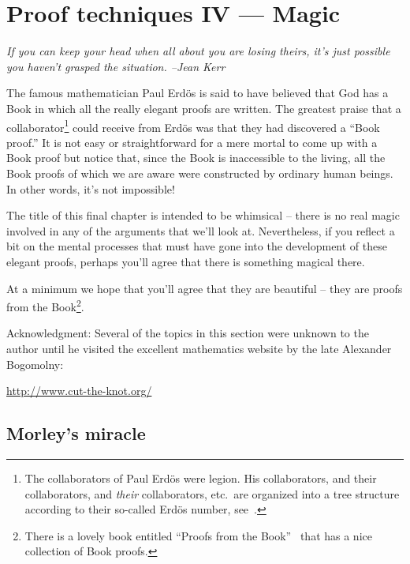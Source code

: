 
\chapter{Proof techniques IV --- Magic}
\label{ch:magic}

{\em If you can keep your head when all about you are losing theirs, it's 
just possible you haven't grasped the situation. --Jean Kerr} 

\vspace{.3in}

The famous mathematician 
 Paul Erd\"{o}s is said to have believed that
God has a Book in which all the really elegant proofs are written.
The greatest praise that a collaborator\footnote{The collaborators
of Paul Erd\"{o}s were legion.  His collaborators, and their collaborators,
and \emph{their} collaborators, etc.\ are organized into a tree structure 
according to their so-called Erd\"{o}s number,
see~\cite{wiki-Erdos_number}.} could receive from Erd\"{o}s
was that they had discovered a ``Book proof.''   It is not
easy or straightforward for a mere mortal to come up with a Book 
proof but notice that, since the Book is inaccessible to the living,
all the Book proofs of which we are aware were constructed by ordinary
human beings.  In other words, it's not impossible!

The title of this final chapter is intended to be whimsical -- there
is no real magic involved in any of the arguments that we'll look at.  
Nevertheless, if you  reflect a bit on the mental processes that 
must have gone into the development of these elegant proofs, perhaps
you'll agree that there is something magical there.   

At a minimum
we hope that you'll agree that they are beautiful -- they are proofs
from the Book\footnote{There is a lovely book entitled ``Proofs from the
Book''~\cite{pftB} that has a nice collection of Book proofs.}.

Acknowledgment: Several of the topics in this section were unknown to
the author until he visited the excellent mathematics website
by the late Alexander Bogomolny:

\url{http://www.cut-the-knot.org/}

\clearpage

\section{Morley's miracle}
\label{sec:morley}

